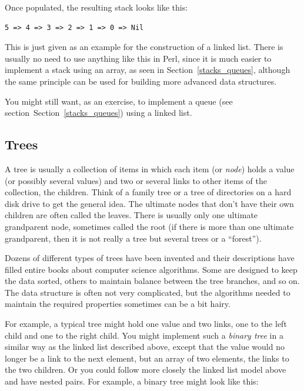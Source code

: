Once populated, the resulting stack looks like this:

\begin{verbatim}
5 => 4 => 3 => 2 => 1 => 0 => Nil
\end{verbatim}

This is just given as an example for the construction of a 
linked list. There is usually no need to use anything like 
this in Perl, since it is much easier to implement 
a stack using an array, as seen in Section~\ref{stacks_queues}, 
although the same principle can be used for building more 
advanced data structures.

You might still want, as an exercise, to implement a queue 
(see section~Section~\ref{stacks_queues}) using a linked list. 

\subsection{Trees}
\label{tree}

A tree is usually a collection of items in which each 
item (or \emph{node}) holds a value (or possibly 
several values) and two or several 
links to other items of the collection, the children. Think 
of a family tree or a tree of directories on a hard disk 
drive to get the general idea. The ultimate 
nodes that don't have their own children are often called 
the leaves. There is usually only one ultimate grandparent 
node, sometimes called the root (if there is more than one 
ultimate grandparent, then it is not really a tree but 
several trees or a ``forest'').

Dozens of different types of trees have been invented and 
their descriptions have filled entire books about computer 
science algorithms. Some are designed 
to keep the data sorted, others to maintain balance between 
the tree branches, and so on. The data structure is often 
not very complicated, but the algorithms needed to maintain the 
required properties sometimes can be a bit hairy.

For example, a 
typical tree might hold one value and two links, one to 
the left child and one to the right child. You 
might implement such a \emph{binary tree} in a similar way as the 
linked list described above, except that the value 
would no longer be a link to the next element, but an 
array of two elements, the links to the two children. 
Or you could follow more closely the linked list model 
above and have nested pairs. For example, a binary tree 
might look like this:

